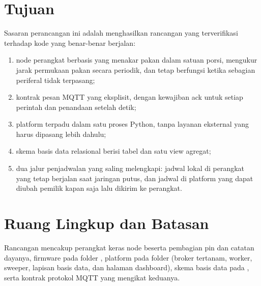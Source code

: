 \section{Tujuan}

Sasaran perancangan ini adalah menghasilkan rancangan yang terverifikasi terhadap
kode yang benar-benar berjalan:
\begin{enumerate}[leftmargin=*,itemsep=2pt]
  \item node perangkat berbasis \BoardName{} yang menakar pakan dalam satuan
        porsi, mengukur jarak permukaan pakan secara periodik, dan tetap berfungsi
        ketika sebagian periferal tidak terpasang;
  \item kontrak pesan MQTT yang eksplisit, dengan kewajiban ack untuk setiap
        perintah dan penandaan  setelah \CmdTimeoutS{} detik;
  \item platform terpadu dalam satu proses Python, tanpa layanan eksternal yang
        harus dipasang lebih dahulu;
  \item skema basis data relasional berisi \NumTables{} tabel dan satu view agregat;
  \item dua jalur penjadwalan yang saling melengkapi: jadwal lokal di perangkat
        yang tetap berjalan saat jaringan putus, dan jadwal di platform yang dapat
        diubah pemilik kapan saja lalu dikirim ke perangkat.
\end{enumerate}

\section{Ruang Lingkup dan Batasan}

Rancangan mencakup perangkat keras node beserta pembagian pin dan catatan dayanya,
firmware \FwVersion{} pada folder , platform pada folder
 (broker tertanam, worker, sweeper, lapisan basis data, dan
\NumPages{} halaman dashboard), skema basis data pada ,
serta kontrak protokol MQTT yang mengikat keduanya.

